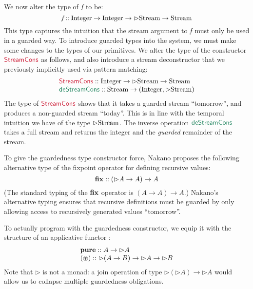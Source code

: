 We now alter the type of $\textit{f}$ to be:
\begin{displaymath}
  \textit{f} :: \textrm{Integer} \to \textrm{Integer} \to \rhd\textrm{Stream} \to \textrm{Stream}
\end{displaymath}
This type captures the intuition that the stream argument to
$\textit{f}$ must only be used in a guarded way. To introduce
guarded types into the system, we must make some changes to the types
of our primitives. We alter the type of the constructor
$\cons{StreamCons}$ as follows, and also introduce a stream
deconstructor that we previously implicitly used via pattern matching:
\begin{displaymath}
  \begin{array}{l}
    \cons{StreamCons} :: \tyname{Integer} \to \rhd\tyname{Stream} \to \tyname{Stream} \\
    \elim{deStreamCons} :: \tyname{Stream} \to (\tyname{Integer}, \rhd\tyname{Stream})
  \end{array}
\end{displaymath}
The type of $\cons{StreamCons}$ shows that it takes a guarded stream
``tomorrow'', and produces a non-guarded stream ``today''. This is in
line with the temporal intuition we have of the type
$\rhd\textrm{Stream}$. The inverse operation $\elim{deStreamCons}$
takes a full stream and returns the integer and the \emph{guarded}
remainder of the stream.

To give the guardedness type constructor force, Nakano proposes the
following alternative type of the fixpoint operator for defining
recursive values:
\begin{displaymath}
  \textbf{fix} :: (\rhd A \to A) \to A
\end{displaymath}
(The standard typing of the $\textbf{fix}$ operator is $(A \to A) \to
A$.) Nakano's alternative typing ensures that recursive definitions
must be guarded by only allowing access to recursively generated
values ``tomorrow''.

To actually program with the guardedness constructor, we equip it with
the structure of an applicative functor \cite{mcbride08applicative}:
\begin{displaymath}
  \begin{array}{l}
    \textbf{pure} :: A \to \rhd A \\
    \textbf{$(\circledast)$} :: \rhd (A \to B) \to \rhd A \to \rhd B
  \end{array}
\end{displaymath}
Note that $\rhd$ is not a monad: a join operation of type $\rhd(\rhd
A) \to \rhd A$ would allow us to collapse multiple guardedness
obligations.

